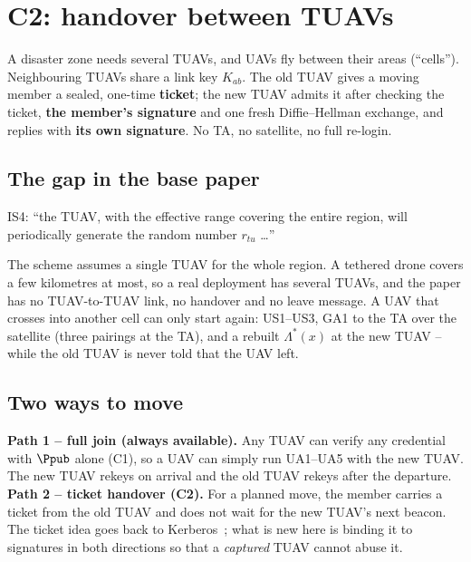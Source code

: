 \chapter{C2: handover between TUAVs}\label{ch:c2}
\begin{keybox}[colframe=hoc,colback=hoc!5]
A disaster zone needs several TUAVs, and UAVs fly between their areas (``cells''). Neighbouring TUAVs share a link key $K_{ab}$. The old TUAV gives a
moving member a sealed, one-time \textbf{ticket}; the new TUAV admits it after checking the ticket, \textbf{the member's signature} and one fresh
Diffie--Hellman exchange, and replies with \textbf{its own signature}. No TA, no satellite, no full re-login.
\end{keybox}

\section{The gap in the base paper}
\begin{claimbox}
IS4: ``the TUAV, with the effective range covering the entire region, will periodically generate the random number $r_{tu}$ \dots''
\end{claimbox}
The scheme assumes a single TUAV for the whole region. A tethered drone covers a few kilometres at most, so a real deployment has several TUAVs, and the
paper has no TUAV-to-TUAV link, no handover and no leave message. A UAV that crosses into another cell can only start again: US1--US3, GA1 to the TA over
the satellite (three pairings at the TA), and a rebuilt $\Lambda^*(x)$ at the new TUAV -- while the old TUAV is never told that the UAV left.


\section{Two ways to move}
\textbf{Path 1 -- full join (always available).} Any TUAV can verify any credential with $\Ppub$ alone (C1), so a UAV can simply run UA1--UA5 with the
new TUAV. The new TUAV rekeys on arrival and the old TUAV rekeys after the departure.\\
\textbf{Path 2 -- ticket handover (C2).} For a planned move, the member carries a ticket from the old TUAV and does not wait for the new TUAV's next beacon.
The ticket idea goes back to Kerberos~\cite{kerberos94}; what is new here is binding it to signatures in both directions so that a \emph{captured} TUAV
cannot abuse it.

